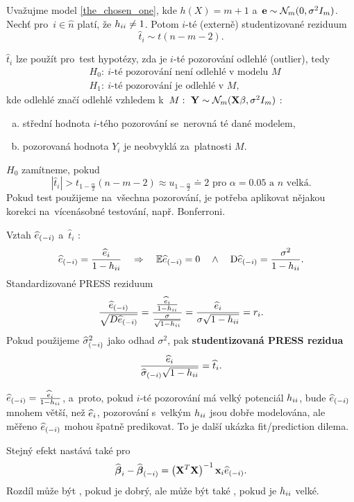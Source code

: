 \begin{corollary}
	Uvažujme model \eqref{the_chosen_one}, kde $h(X) = m+1$ a~$\mathbf{e}\sim\mathcal{N}_m(0,\sigma^2 I_m)$. Nechť pro~$i\in\widehat{n}$ platí, že $h_{ii}\neq1$. Potom $i$-té (externě) studentizované reziduum
	 $$ \widehat{t}_i\sim t(n-m-2). $$
\end{corollary}
\begin{remark}
	 $\widehat{t}_i$ lze použít pro~test hypotézy, zda je $i$-té pozorování odlehlé (outlier), tedy
	\[
	\begin{split}
	&H_0:~i\text{-té pozorování není odlehlé v~modelu }M\\
	&H_1:~i\text{-té pozorování je odlehlé v~}M,
	\end{split}
	\] kde odlehlé značí odlehlé vzhledem k~$M:~\mathbf{Y}\sim\mathcal{N}_m(\textbf{X}\beta,\sigma^2 I_m)$ :\begin{enumerate}[a)]
		\item střední hodnota $i$-tého pozorování se~nerovná té dané modelem,
		\item pozorovaná hodnota $Y_i$ je neobvyklá za~platnosti $M$.
	\end{enumerate}
 $H_0$ zamítneme, pokud $$ |\widehat{t}_i|>t_{1-\frac{\alpha}{2}}(n-m-2)\approx u_{1-\frac{\alpha}{2}} \doteq 2\text{ pro~}\alpha = 0.05\text{ a~}n\text{ velká}. $$
Pokud test použijeme na~všechna pozorování, je potřeba aplikovat nějakou korekci na~vícenásobné testování, např. Bonferroni.
\end{remark}
\begin{remark}
	Vztah $\widehat{e}_{(-i)}$ a~$\widehat{t}_i$ :
	 $$ \widehat{e}_{(-i)} = \frac{\widehat{e}_i}{1-h_{ii}}\quad\Rightarrow\quad\mathbb{E}\widehat{e}_{(-i)} = 0\quad\wedge\quad \mathrm{D} \widehat{e}_{(-i)} = \frac{\sigma^2}{1-h_{ii}}. $$
	Standardizované PRESS reziduum $$ \frac{\widehat{e}_{(-i)}}{\sqrt{D\widehat{e}_{(-i)}}} = \frac{\frac{\widehat{e}_i}{1-h_{ii}}}{\frac{\sigma}{\sqrt{1-h_{ii}}}} = \frac{\widehat{e}_i}{\sigma\sqrt{1-h_{ii}}} = r_i. $$
	Pokud použijeme $\widehat{\sigma}^2_{(-i)}$ jako odhad $\sigma^2$, pak \textbf{studentizovaná PRESS rezidua} $$ \frac{\widehat{e}_i}{\widehat{{\sigma}}_{(-i)}\sqrt{1-h_{ii}}} = \widehat{t}_i. $$
\end{remark}
\begin{remark}
	 $\widehat{e}_{(-i)} = \frac{\widehat{e}_i}{1-h_{ii}}$, a~proto, pokud $i$-té pozorování má velký potenciál $h_{ii}$, bude $\widehat{e}_{(-i)}$ mnohem větší, než $\widehat{e}_i$, pozorování s~velkým $h_{ii}$ jsou dobře modelována, ale měřeno $\widehat{e}_{(-i)}$ mohou špatně predikovat. To je další ukázka fit/prediction dilema.
	
	Stejný efekt nastává také pro~
	 $$ \widehat{\boldsymbol{\beta}}_i-\widehat{\boldsymbol{\beta}}_{(-i)} = \left(\mathbf{X}^T \mathbf{X} \right)^{-1} \mathbf{x}_i\widehat{e}_{(-i)}. $$
	Rozdíl může být , pokud je  dobrý, ale může být také , pokud je $h_{ii}$ velké.
\end{remark}

